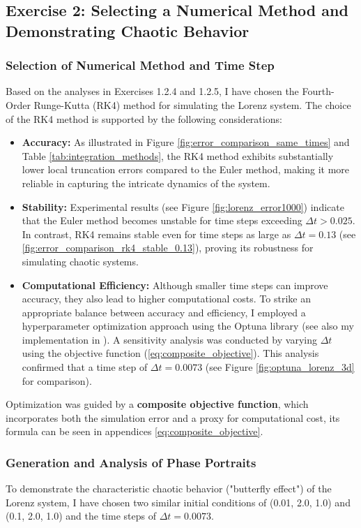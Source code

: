 \subsection{Exercise 2: Selecting a Numerical Method and Demonstrating Chaotic Behavior}

\subsubsection{Selection of Numerical Method and Time Step}
Based on the analyses in Exercises 1.2.4 and 1.2.5, I have chosen the Fourth-Order Runge-Kutta (RK4) method for simulating the Lorenz system.
The choice of the RK4 method is supported by the following considerations:

\begin{itemize}
    \item \textbf{Accuracy:} As illustrated in Figure \ref{fig:error_comparison_same_times} and Table \ref{tab:integration_methods}, the RK4 method exhibits substantially lower local truncation errors compared to the Euler method, making it more reliable in capturing the intricate dynamics of the system.
    \item \textbf{Stability:} Experimental results (see Figure \ref{fig:lorenz_error1000}) indicate that the Euler method becomes unstable for time steps exceeding \(\Delta t > 0.025\). In contrast, RK4 remains stable even for time steps as large as \(\Delta t = 0.13\) (see \ref{fig:error_comparison_rk4_stable_0.13}), proving its robustness for simulating chaotic systems.
    \item \textbf{Computational Efficiency:} Although smaller time steps can improve accuracy, they also lead to higher computational costs. To strike an appropriate balance between accuracy and efficiency, I employed a hyperparameter optimization approach using the Optuna library \cite{akiba2019optuna} (see also my implementation in \cite{youngaryanOptunaCode}). A sensitivity analysis was conducted by varying \(\Delta t\) using the objective function (\ref{eq:composite_objective}). This analysis confirmed that a time step of \(\Delta t = 0.0073\) (see Figure \ref{fig:optuna_lorenz_3d} for comparison).
\end{itemize}

\noindent
Optimization was guided by a \textbf{composite objective function}, which incorporates both the simulation error and a proxy for computational cost, its formula can be seen in appendices \ref{eq:composite_objective}.

\subsubsection{Generation and Analysis of Phase Portraits}
To demonstrate the characteristic chaotic behavior ("butterfly effect") of the Lorenz system, I have chosen two similar initial conditions of (0.01, 2.0, 1.0) and (0.1, 2.0, 1.0) and the time steps of \(\Delta t = 0.0073\).

